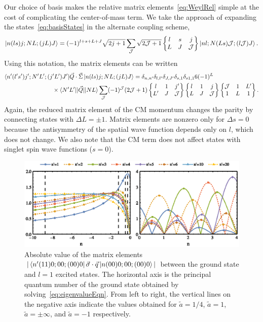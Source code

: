 \documentclass[%
 onecolumn,
 notitlepage,
 amsmath,amssymb,
 aps,
]{revtex4-1}
\newcommand{\sixj}[6]{ \begin{Bmatrix}
  #1 & #2 & #3 \\
  #4 & #5 & #6 
 \end{Bmatrix}}
\begin{document}
Our choice of basis makes the relative matrix elements~\eqref{eq:WeylRel} simple at the cost of complicating the center-of-mass term. We take the approach of expanding the states~\eqref{eq:basisStates} in the alternate coupling scheme,
\begin{equation}\label{eq:basisStates2}
\ket{n(ls)j;NL;(jL)J}=(-1)^{l+s+L+J}\sqrt{2j+1}\sum_{\mathcal{J}}\sqrt{2\mathcal{J}+1}\sixj{l}{s}{j}{L}{J}{\mathcal{J}}\ket{nl;N(Ls)\mathcal{J};(l\mathcal{J})J}.
\end{equation}
Using this notation, the matrix elements can be written
\begin{equation}\begin{split}
\bra{n'(l's')j';N'L';(j'L')J'}&\vec{Q}\cdot\vec{\Sigma} \ket{n(ls)j;NL;(jL)J} = \delta_{n,n'}\delta_{l,l'}\delta_{J,J'}\delta_{s,1}\delta_{s1,1}   6 (-1)^{L} \\
&\hspace{-1cm}\times\braket{N'L'|| \vec{Q} || NL} \sum_{\mathcal{J}}(-1)^\mathcal{J} (2\mathcal{J}+1)\sixj{l}{1}{j'}{L'}{J}{\mathcal{J}}\sixj{l}{1}{j}{L}{J}{\mathcal{J}}\sixj{\mathcal{J}}{1}{L'}{1}{L}{1}.
\end{split}
\end{equation}
Again, the reduced matrix element of the CM momentum changes the parity by connecting states with $\Delta L=\pm1$. Matrix elements are nonzero only for $\Delta s=0$ because the antisymmetry of the spatial wave function depends only on $l$, which does not change. We also note that the CM term does not affect states with singlet spin wave functions ($s=0$).


\begin{figure}
\includegraphics{Figures/MatrixElts}
\caption{\label{fig:matrixElts}Absolute value of the matrix elements $|\bra{n'(11)0;00;(00)0}\vec{\sigma}\cdot\vec{q}\ket{n(00)0;00;(00)0}|$ between the ground state and $l=1$ excited states. The horizontal axis is the principal quantum number of the ground state obtained by solving~\eqref{eq:eigenvalueEqn}. From left to right, the vertical lines on the negative axis indicate the values obtained for $\tilde{a}=1/4$, $\tilde{a}=1$, $\tilde{a}=\pm\infty$, and $\tilde{a}=-1$ respectively.} 
\end{figure}
\end{document}
